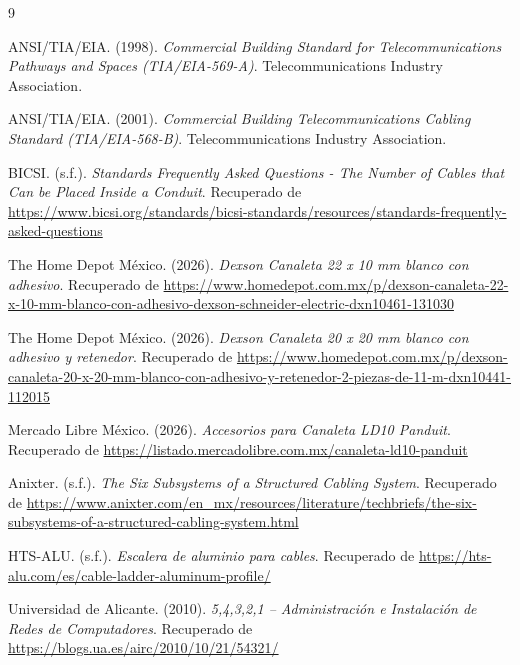 \documentclass[a4paper,12pt]{article}
\begin{document}
\begin{thebibliography}{9}

    ANSI/TIA/EIA. (1998). \textit{Commercial Building Standard for Telecommunications Pathways and Spaces (TIA/EIA-569-A)}. Telecommunications Industry Association.

    ANSI/TIA/EIA. (2001). \textit{Commercial Building Telecommunications Cabling Standard (TIA/EIA-568-B)}. Telecommunications Industry Association.

    BICSI. (s.f.). \textit{Standards Frequently Asked Questions - The Number of Cables that Can be Placed Inside a Conduit}. Recuperado de \url{https://www.bicsi.org/standards/bicsi-standards/resources/standards-frequently-asked-questions}
    
    The Home Depot México. (2026). \textit{Dexson Canaleta 22 x 10 mm blanco con adhesivo}. Recuperado de \url{https://www.homedepot.com.mx/p/dexson-canaleta-22-x-10-mm-blanco-con-adhesivo-dexson-schneider-electric-dxn10461-131030}

    The Home Depot México. (2026). \textit{Dexson Canaleta 20 x 20 mm blanco con adhesivo y retenedor}. Recuperado de \url{https://www.homedepot.com.mx/p/dexson-canaleta-20-x-20-mm-blanco-con-adhesivo-y-retenedor-2-piezas-de-11-m-dxn10441-112015}

    Mercado Libre México. (2026). \textit{Accesorios para Canaleta LD10 Panduit}. Recuperado de \url{https://listado.mercadolibre.com.mx/canaleta-ld10-panduit}

    Anixter. (s.f.). \textit{The Six Subsystems of a Structured Cabling System}. Recuperado de \url{https://www.anixter.com/en_mx/resources/literature/techbriefs/the-six-subsystems-of-a-structured-cabling-system.html}

    HTS-ALU. (s.f.). \textit{Escalera de aluminio para cables}. Recuperado de \url{https://hts-alu.com/es/cable-ladder-aluminum-profile/}

    Universidad de Alicante. (2010). \textit{5,4,3,2,1 – Administración e Instalación de Redes de Computadores}. Recuperado de \url{https://blogs.ua.es/airc/2010/10/21/54321/}

\end{thebibliography}
\end{document}

